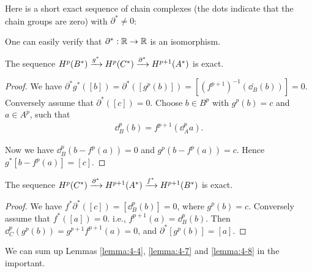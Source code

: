 \begin{example}\label{exampl:4-6}
  Here is a short exact sequence of chain complexes (the dots indicate
  that the chain groups are zero) with $\partial^*\neq 0$:

\begin{center}
\end{center}

One can easily verify that $\partial^*:{\mathbb{R}}\to{\ensuremath{\mathbb{R}}}$ is an isomorphism.
\end{example}


\begin{lemma}\label{lemma:4-7}
  The sequence $H^p(B^*)\xra[g^*] H^p(C^*)\xra[\partial^*]H^{p+1}(A^*)$ is exact.
\end{lemma}

\begin{proof}
  We have $\partial^*g^*([b]) = \partial^*([g^p(b)]) = [(f^{p+1})^{-1} (\!\dd_B(b))] = 0$. Conversely assume 
  that $\partial^*([c]) = 0$. Choose $b\in B^p$ with $g^p(b) = c$ and $a\in A^p$, such that 
  \begin{align*}
    \dd^p_B(b) = f^{p+1}(\!\dd^p_Aa).
  \end{align*}

  Now we have $\dd^p_B(b - f^p(a)) = 0$ and $g^p(b-f^p(a)) = c$. Hence $g^*[b-f^p(a)] = [c]$.
\end{proof}


\begin{lemma}\label{lemma:4-8}
  The sequence $H^p(C^*)\xra[\partial^*] H^{p+1}(A^*)\xra[f^*] H^{p+1}(B^*)$ is exact.
\end{lemma}

\begin{proof}
  We have $f^*\partial^*([c]) = [\dd^p_B(b)] = 0$, where $g^p(b) = c$. Conversely assume that $f^*([a]) = 0$.
i.e., $f^{p+1}(a) = \dd^p_B(b)$. Then $\dd^p_C(g^p(b)) = g^{p+1}f^{p+1}(a) = 0$, and $\partial^*[g^p(b)] = [a]$.
\end{proof}

We can sum up Lemmas \ref{lemma:4-4}, \ref{lemma:4-7} and \ref{lemma:4-8} in the important.



